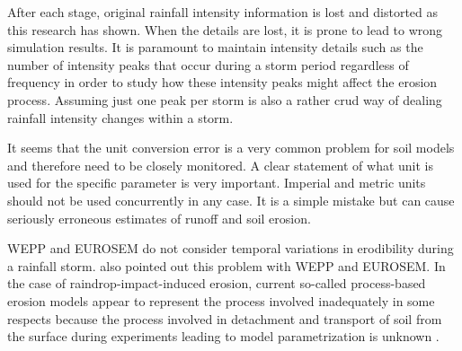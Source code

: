 After each stage, original rainfall intensity information is lost and distorted
as this research has shown.
When the details are lost, it is prone to lead to wrong simulation results. It
is paramount to maintain intensity details such as the number of intensity peaks
that occur during a storm period regardless of frequency in order to study how
these intensity peaks might affect the erosion process. Assuming just one peak
per storm is also a rather crud way of dealing rainfall intensity changes within
a storm.

It seems that the unit conversion error is a very common problem for soil models
and therefore need to be closely monitored. A clear statement of what unit is
used for the specific parameter is very important. Imperial and metric units
should not be used concurrently in any case. It is a simple mistake but can
cause seriously erroneous estimates of runoff and soil erosion.

WEPP and EUROSEM do not consider temporal variations in erodibility during a
rainfall storm. \citet{kinnell2005-2815} also pointed out this problem with WEPP
and EUROSEM. In the case of raindrop-impact-induced erosion, current so-called
process-based erosion models appear to represent the process involved
inadequately in some respects because the process involved in detachment and
transport of soil from the surface during experiments leading to model
parametrization is unknown \citep{kinnell2005-2815}.

%
%
%
%
%


